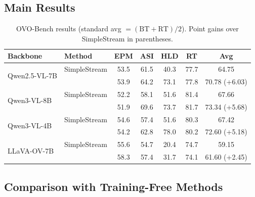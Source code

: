 \subsection{Main Results}
\label{sec:exp-main}
\begin{table}[t]
  \centering
  \caption{OVO-Bench results (standard avg $=(\mathrm{BT}+\mathrm{RT})/2$). Point gains over SimpleStream in parentheses.
  }
  \label{tab:main-ovo}
  \begin{tabular}{llccccc}
    \toprule
    Backbone & Method & EPM & ASI & HLD & RT & Avg \\
    \midrule
    \multirow{2}{*}{Qwen2.5-VL-7B} & SimpleStream & 53.5 & 61.5 & 40.3 & 77.7 & 64.75 \\
                                   & \method{}    & 53.9 & 64.2 & 73.1 & 77.8 & 70.78 (+6.03) \\
    \midrule
    \multirow{2}{*}{Qwen3-VL-8B}   & SimpleStream & 52.2 & 58.1 & 51.6 & 81.4 & 67.66 \\
                                   & \method{}    & 51.9 & 69.6 & 73.7 & 81.7 & 73.34 (+5.68) \\
    \midrule
    \multirow{2}{*}{Qwen3-VL-4B}   & SimpleStream & 54.6 & 57.4 & 51.6 & 80.3 & 67.42 \\
                                   & \method{}    & 54.2 & 62.8 & 78.0 & 80.2 & 72.60 (+5.18) \\
    \midrule
    \multirow{2}{*}{LLaVA-OV-7B}   & SimpleStream & 55.6 & 54.7 & 20.4 & 74.7 & 59.15 \\
                                   & \method{}    & 58.3 & 57.4 & 31.7 & 74.1 & 61.60 (+2.45) \\
    \bottomrule
  \end{tabular}
\end{table}

\subsection{Comparison with Training-Free Methods}
\label{sec:exp-compare}

